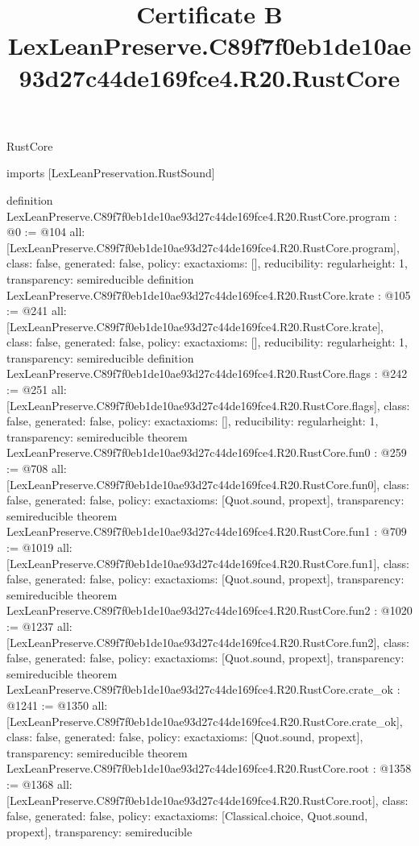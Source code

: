 \begin{lexlean}{RustCore}
\title{Certificate B LexLeanPreserve.C89f7f0eb1de10ae93d27c44de169fce4.R20.RustCore}
\begin{coremodule}
imports [LexLeanPreservation.RustSound]

definition LexLeanPreserve.C89f7f0eb1de10ae93d27c44de169fce4.R20.RustCore.program : @0 := @104 {
  all: [LexLeanPreserve.C89f7f0eb1de10ae93d27c44de169fce4.R20.RustCore.program],
  class: false,
  generated: false,
  policy: exact{axioms: []},
  reducibility: regular{height: 1},
  transparency: semireducible
}
definition LexLeanPreserve.C89f7f0eb1de10ae93d27c44de169fce4.R20.RustCore.krate : @105 := @241 {
  all: [LexLeanPreserve.C89f7f0eb1de10ae93d27c44de169fce4.R20.RustCore.krate],
  class: false,
  generated: false,
  policy: exact{axioms: []},
  reducibility: regular{height: 1},
  transparency: semireducible
}
definition LexLeanPreserve.C89f7f0eb1de10ae93d27c44de169fce4.R20.RustCore.flags : @242 := @251 {
  all: [LexLeanPreserve.C89f7f0eb1de10ae93d27c44de169fce4.R20.RustCore.flags],
  class: false,
  generated: false,
  policy: exact{axioms: []},
  reducibility: regular{height: 1},
  transparency: semireducible
}
theorem LexLeanPreserve.C89f7f0eb1de10ae93d27c44de169fce4.R20.RustCore.fun0 : @259 := @708 {
  all: [LexLeanPreserve.C89f7f0eb1de10ae93d27c44de169fce4.R20.RustCore.fun0],
  class: false,
  generated: false,
  policy: exact{axioms: [Quot.sound, propext]},
  transparency: semireducible
}
theorem LexLeanPreserve.C89f7f0eb1de10ae93d27c44de169fce4.R20.RustCore.fun1 : @709 := @1019 {
  all: [LexLeanPreserve.C89f7f0eb1de10ae93d27c44de169fce4.R20.RustCore.fun1],
  class: false,
  generated: false,
  policy: exact{axioms: [Quot.sound, propext]},
  transparency: semireducible
}
theorem LexLeanPreserve.C89f7f0eb1de10ae93d27c44de169fce4.R20.RustCore.fun2 : @1020 := @1237 {
  all: [LexLeanPreserve.C89f7f0eb1de10ae93d27c44de169fce4.R20.RustCore.fun2],
  class: false,
  generated: false,
  policy: exact{axioms: [Quot.sound, propext]},
  transparency: semireducible
}
theorem LexLeanPreserve.C89f7f0eb1de10ae93d27c44de169fce4.R20.RustCore.crate_ok : @1241 := @1350 {
  all: [LexLeanPreserve.C89f7f0eb1de10ae93d27c44de169fce4.R20.RustCore.crate_ok],
  class: false,
  generated: false,
  policy: exact{axioms: [Quot.sound, propext]},
  transparency: semireducible
}
theorem LexLeanPreserve.C89f7f0eb1de10ae93d27c44de169fce4.R20.RustCore.root : @1358 := @1368 {
  all: [LexLeanPreserve.C89f7f0eb1de10ae93d27c44de169fce4.R20.RustCore.root],
  class: false,
  generated: false,
  policy: exact{axioms: [Classical.choice, Quot.sound, propext]},
  transparency: semireducible
}


\end{coremodule}
\end{lexlean}
